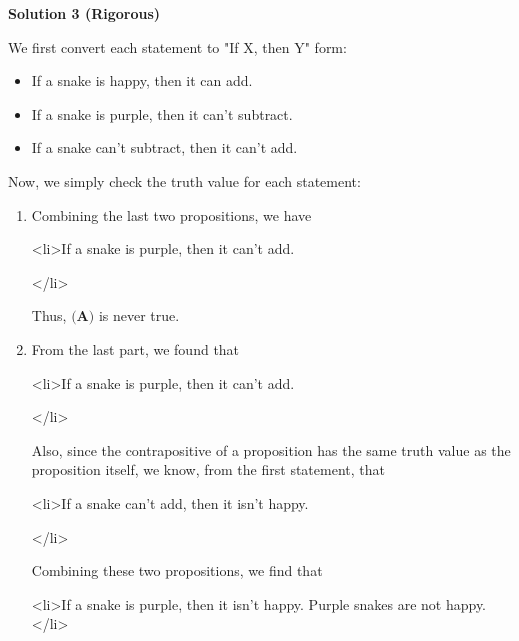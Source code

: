 \begin{enumerate}
 



\textbf{Solution 3 (Rigorous)}

We first convert each statement to "If X, then Y" form:

 
            \begin{itemize}
        \item If a snake is happy, then it can add.
            \end{itemize}
            
            \begin{itemize}
        \item If a snake is purple, then it can't subtract.
            \end{itemize}
            
            \begin{itemize}
        \item If a snake can't subtract, then it can't add.
            \end{itemize}
            Now, we simply check the truth value for each statement: 

 
            \begin{enumerate} 
        \item Combining the last two propositions, we have
            \begin{itemize}<li>If a snake is purple, then it can't add. 

 </li>
            \end{itemize}
            Thus, $\textbf{(A)}$ is never true.

        \item From the last part, we found that
            \begin{itemize}<li>If a snake is purple, then it can't add. 

 </li>
            \end{itemize}
            Also, since the contrapositive of a proposition has the same truth value as the proposition itself, we know, from the first statement, that 
            \begin{itemize}<li>If a snake can't add, then it isn't happy. 

 </li>
            \end{itemize}
            Combining these two propositions, we find that 
            \begin{itemize}<li>If a snake is purple, then it isn't happy. Purple snakes are not happy.</li>


\end{itemize}
\end{enumerate}
\end{enumerate}
